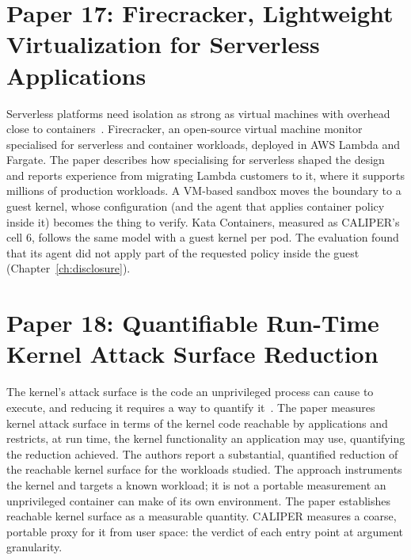 \section{Paper 17: Firecracker, Lightweight Virtualization for Serverless Applications}
\label{lit:firecracker}

 Serverless platforms need isolation as strong as virtual machines with overhead close to containers~\cite{firecracker}.
 Firecracker, an open-source virtual machine monitor specialised for serverless and container workloads, deployed in AWS Lambda and Fargate.
 The paper describes how specialising for serverless shaped the design and reports experience from migrating Lambda customers to it, where it supports millions of production workloads.
 A VM-based sandbox moves the boundary to a guest kernel, whose configuration (and the agent that applies container policy inside it) becomes the thing to verify.
 Kata Containers, measured as CALIPER's cell 6, follows the same model with a guest kernel per pod. The evaluation found that its agent did not apply part of the requested policy inside the guest (Chapter~\ref{ch:disclosure}).

\section{Paper 18: Quantifiable Run-Time Kernel Attack Surface Reduction}
\label{lit:kurmus}

 The kernel's attack surface is the code an unprivileged process can cause to execute, and reducing it requires a way to quantify it~\cite{kurmus2014}.
 The paper measures kernel attack surface in terms of the kernel code reachable by applications and restricts, at run time, the kernel functionality an application may use, quantifying the reduction achieved.
 The authors report a substantial, quantified reduction of the reachable kernel surface for the workloads studied.
 The approach instruments the kernel and targets a known workload; it is not a portable measurement an unprivileged container can make of its own environment.
 The paper establishes reachable kernel surface as a measurable quantity. CALIPER measures a coarse, portable proxy for it from user space: the verdict of each entry point at argument granularity.

